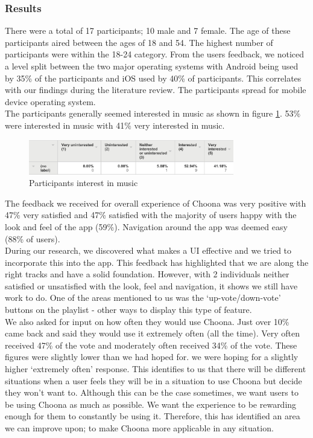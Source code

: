\subsubsection{Results}
There were a total of 17 participants; 10 male and 7 female. The age of these participants aired between the ages of 18 and 54. The highest number of participants were within the 18-24 category.    
From the users feedback, we noticed a level split between the two major operating systems with Android being used by 35\% of the participants and iOS used by 40\% of participants.  This correlates with our findings during the literature review.  The participants spread for mobile device operating system.  \\
The participants generally seemed interested in music as shown in figure \ref{fig:interest_music}.  53\% were interested in music with 41\% very interested in music.  \\

    \begin{figure}[h!]
      \centering
      \includegraphics[width=0.8\textwidth]{./img/music_interest.png}
      \caption{Participants interest in music}
      \label{fig:interest_music}
    \end{figure}

The feedback we received for overall experience of Choona was very positive with 47\% very satisfied and 47\% satisfied with the majority of users happy with the look and feel of the app (59\%).  Navigation around the app was deemed easy (88\% of users).  \\
During our research, we discovered what makes a UI effective and we tried to incorporate this into the app.  This feedback has highlighted that we are along the right tracks and have a solid foundation.  However, with 2 individuals neither satisfied or unsatisfied with the look, feel and navigation, it shows we still have work to do.  One of the areas mentioned to us was the `up-vote/down-vote' buttons on the playlist - other ways to display this type of feature.  \\

We also asked for input on how often they would use Choona.  Just over 10\% came back and said they would use it extremely often (all the time).  Very often received 47\% of the vote and moderately often received 34\% of the vote.  These figures were slightly lower than we had hoped for.  we were hoping for a slightly higher `extremely often' response.  This identifies to us that there will be different situations when a user feels they will be in a situation to use Choona but decide they won't want to.  Although this can be the case sometimes, we want users to be using Choona as much as possible.  We want the experience to be rewarding enough for them to constantly be using it.  Therefore, this has identified an area we can improve upon; to make Choona more applicable in any situation.  \\

